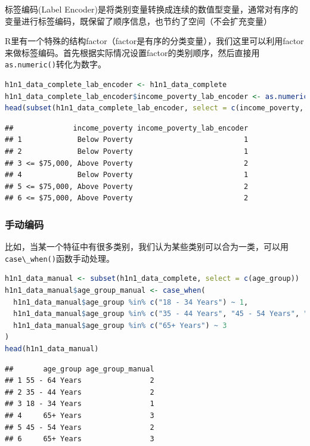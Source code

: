 \documentclass[]{ctexbook}
\newcommand{\passthrough}[1]{#1}
\begin{document}
标签编码(Label Encoder)是将类别变量转换成连续的数值型变量，通常对有序的变量进行标签编码，既保留了顺序信息，也节约了空间（不会扩充变量）

R里有一个特殊的结构factor（factor是有序的分类变量），我们这里可以利用factor来做标签编码。首先根据实际情况设置factor的类别顺序，然后直接用\passthrough{\lstinline!as.numeric()!}转化为数字。

\begin{lstlisting}[language=R]
h1n1_data_complete_lab_encoder <- h1n1_data_complete
h1n1_data_complete_lab_encoder$income_poverty_lab_encoder <- as.numeric(factor(h1n1_data_complete_lab_encoder$income_poverty, levels = c("Below Poverty", "<= $75,000, Above Poverty", "> $75,000")))
head(subset(h1n1_data_complete_lab_encoder, select = c(income_poverty, income_poverty_lab_encoder)))
\end{lstlisting}

\begin{lstlisting}
##              income_poverty income_poverty_lab_encoder
## 1             Below Poverty                          1
## 2             Below Poverty                          1
## 3 <= $75,000, Above Poverty                          2
## 4             Below Poverty                          1
## 5 <= $75,000, Above Poverty                          2
## 6 <= $75,000, Above Poverty                          2
\end{lstlisting}

\hypertarget{ux624bux52a8ux7f16ux7801}{%
\subsubsection{手动编码}\label{ux624bux52a8ux7f16ux7801}}

比如，当某一个特征中有很多类别，我们认为某些类别可以合为一类，可以用\passthrough{\lstinline!case\_when()!}函数手动处理。

\begin{lstlisting}[language=R]
h1n1_data_manual <- subset(h1n1_data_complete, select = c(age_group))
h1n1_data_manual$age_group_manual <- case_when(
  h1n1_data_manual$age_group %in% c("18 - 34 Years") ~ 1,
  h1n1_data_manual$age_group %in% c("35 - 44 Years", "45 - 54 Years", "55 - 64 Years") ~ 2,
  h1n1_data_manual$age_group %in% c("65+ Years") ~ 3
)
head(h1n1_data_manual)
\end{lstlisting}

\begin{lstlisting}
##       age_group age_group_manual
## 1 55 - 64 Years                2
## 2 35 - 44 Years                2
## 3 18 - 34 Years                1
## 4     65+ Years                3
## 5 45 - 54 Years                2
## 6     65+ Years                3
\end{lstlisting}
\end{document}
